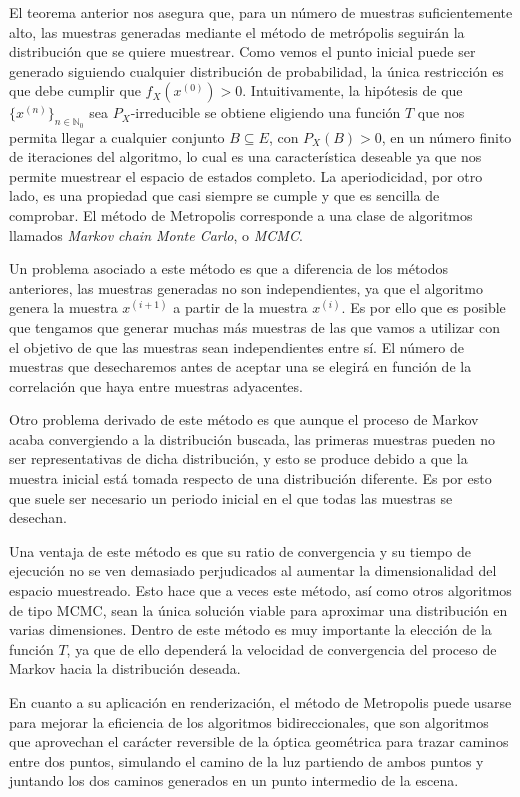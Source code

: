 El teorema anterior nos asegura que, para un número de muestras suficientemente alto, las muestras generadas mediante el método de metrópolis seguirán la distribución que se quiere muestrear. Como vemos el punto inicial puede ser generado siguiendo cualquier distribución de probabilidad, la única restricción es que debe cumplir que $f_X(x^{(0)})>0$. Intuitivamente, la hipótesis de que $\{x^{(n)}\}_{n\in\mathds{N}_0}$ sea $P_X$-irreducible se obtiene eligiendo una función $T$ que nos permita llegar a cualquier conjunto $B\subseteq E$, con $P_X(B)>0$, en un número finito de iteraciones del algoritmo, lo cual es una característica deseable ya que nos permite muestrear el espacio de estados completo. La aperiodicidad, por otro lado, es una propiedad que casi siempre se cumple y que es sencilla de comprobar. El método de Metropolis corresponde a una clase de algoritmos llamados \emph{Markov chain Monte Carlo}, o \emph{MCMC}.

Un problema asociado a este método es que a diferencia de los métodos anteriores, las muestras generadas no son independientes, ya que el algoritmo genera la muestra $x^{(i+1)}$ a partir de la muestra $x^{(i)}$. Es por ello que es posible que tengamos que generar muchas más muestras de las que vamos a utilizar con el objetivo de que las muestras sean independientes entre sí. El número de muestras que desecharemos antes de aceptar una se elegirá en función de la correlación que haya entre muestras adyacentes.

Otro problema derivado de este método es que aunque el proceso de Markov acaba convergiendo a la distribución buscada, las primeras muestras pueden no ser representativas de dicha distribución, y esto se produce debido a que la muestra inicial está tomada respecto de una distribución diferente. Es por esto que suele ser necesario un periodo inicial en el que todas las muestras se desechan.

Una ventaja de este método es que su ratio de convergencia y su tiempo de ejecución no se ven demasiado perjudicados al aumentar la dimensionalidad del espacio muestreado. Esto hace que a veces este método, así como otros algoritmos de tipo MCMC, sean la única solución viable para aproximar una distribución en varias dimensiones. Dentro de este método es muy importante la elección de la función $T$, ya que de ello dependerá la velocidad de convergencia del proceso de Markov hacia la distribución deseada.

En cuanto a su aplicación en renderización, el método de Metropolis puede usarse para mejorar la eficiencia de los algoritmos bidireccionales, que son algoritmos que aprovechan el carácter reversible de la óptica geométrica para trazar caminos entre dos puntos, simulando el camino de la luz partiendo de ambos puntos y juntando los dos caminos generados en un punto intermedio de la escena.

